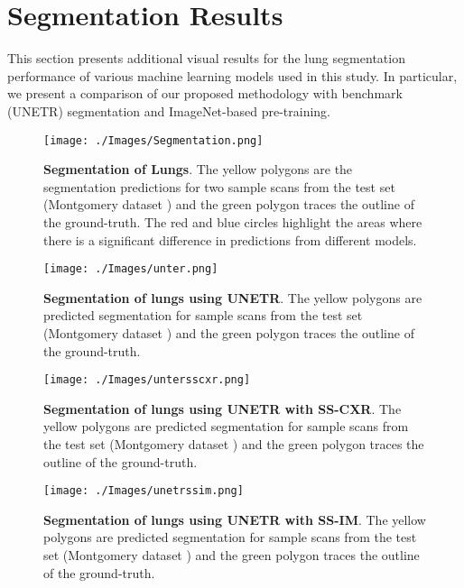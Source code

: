 \documentclass[10pt,journal,compsoc]{IEEEtran}
\begin{document}
\section{Segmentation Results}\label{section:appendix-seg}

This section presents additional visual results for the lung segmentation performance of various machine learning models used in this study. In particular, we present a comparison of our proposed methodology with benchmark (UNETR) segmentation and ImageNet-based pre-training. 

\begin{figure*}[ht]
\begin{center}  
\texttt{[image: ./Images/Segmentation.png]}
\end{center}
\caption{\textbf{Segmentation of Lungs}. The yellow polygons are the segmentation predictions for two sample scans from the test set (Montgomery dataset \cite{candemir2013lung}) and the green polygon traces the outline of the ground-truth. The red and blue circles highlight the areas where there is a significant difference in predictions from different models. }
\label{fig:segmentation-zoomed}
\end{figure*}

\begin{figure*}[ht]
\begin{center}  
\texttt{[image: ./Images/unter.png]}
\end{center}
\caption{\textbf{Segmentation of lungs using UNETR\cite{unetr}}. The yellow polygons are predicted segmentation for sample scans from the test set (Montgomery dataset \cite{candemir2013lung}) and the green polygon traces the outline of the ground-truth.}
\end{figure*}

\begin{figure*}[ht]
\begin{center}  
\texttt{[image: ./Images/untersscxr.png]}
\end{center}
\caption{\textbf{Segmentation of lungs using UNETR with SS-CXR}. The yellow polygons are predicted segmentation for sample scans from the test set (Montgomery dataset \cite{candemir2013lung}) and the green polygon traces the outline of the ground-truth.}
\end{figure*}

\begin{figure*}[ht]
\begin{center}  
\texttt{[image: ./Images/unetrssim.png]}
\end{center}
\caption{\textbf{Segmentation of lungs using UNETR with SS-IM}. The yellow polygons are predicted segmentation for sample scans from the test set (Montgomery dataset \cite{candemir2013lung}) and the green polygon traces the outline of the ground-truth.}
\end{figure*}
\clearpage
\end{document}
